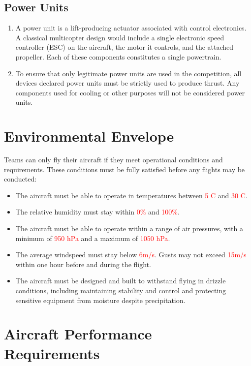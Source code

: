 \documentclass{article}
\begin{document}
\subsection{Power Units}
\begin{enumerate}
  \item A power unit is a lift-producing actuator associated with control electronics. A classical multicopter design would include a single electronic speed controller (ESC) on the aircraft, the motor it controls, and the attached propeller. Each of these components constitutes a single powertrain. 
  \item To ensure that only legitimate power units are used in the competition, all devices declared power units must be strictly used to produce thrust. Any components used for cooling or other purposes will not be considered power units.
\end{enumerate}


\newpage
\newpage

\section{Environmental Envelope}
Teams can only fly their aircraft if they meet operational conditions and requirements. These conditions must be fully satisfied before any flights may be conducted:
\begin {itemize}
  \item The aircraft must be able to operate in temperatures between \textcolor{red}{5 \degree C} and \textcolor{red}{30 \degree C}.
  \item The relative humidity must stay within \textcolor{red}{0\%} and \textcolor{red}{100\%}. 
  \item The aircraft must be able to operate within a range of air pressures, with a minimum of \textcolor{red}{950 hPa} and a maximum of \textcolor{red}{1050 hPa}.
  \item The average windspeed must stay below \textcolor{red}{6m/s}. Gusts may not exceed \textcolor{red}{15m/s} within one hour before and during the flight.
  \item The aircraft must be designed and built to withstand flying in drizzle conditions, including maintaining stability and control and protecting sensitive equipment from moisture despite precipitation.
  
\end {itemize}


\section{Aircraft Performance Requirements}
\end{document}

